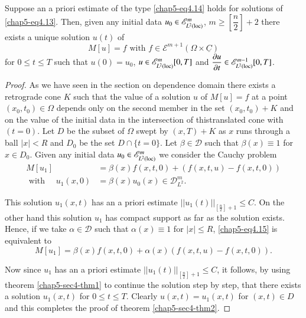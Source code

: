 \begin{theorem}\label{chap5-sec4-thm2} %
 Suppose an a priori estimate of the type \eqref{chap5-eq4.14} holds
 for solutions  of \eqref{chap5-eq4.13}. Then, given any initial data $u_0 \in
 \mathscr{E}^m_{L^2(\operatorname{loc})}$, $m \geq \left[\dfrac{n}{2}\right] + 2$
 there exists a  unique solution $u(t)$ of   
\begin{equation*}
M[u] = f \text{ with } f \in \mathscr{E}^{m+1} (\Omega \times
\underline{C}) \tag{4.1} 
\end{equation*}
for $0 \leq t \leq T$ such that $u(0) = u_0$, $u \in
\mathscr{E}^m_{L^2(\operatorname{loc})} [0, T]$ and $\dfrac{\partial u}{\partial t}
\in \mathscr{E}^{m-1}_{L^2(\operatorname{loc})} [0, T]$. 
\end{theorem}

\begin{proof}
As we have seen in the section on dependence domain there exists a
retrograde cone $K$ such that the value of a solution $u$ of $M [u] =
f$ at a point $(x_0, t_0) \in \Omega$ depends only on the
second member in the set $(x_0, t_0) + K$ and on the value of the
initial data in the intersection  of this\pageoriginale translated
cone with $(t=0)$. Let $D$ be the subset of $\Omega$ swept by $(x, T) + K$ as
$x$ runs through a ball $|x | < R$ and $D_0$ be the set $D \cap \{ t =
0 \}$. Let $\beta \in \mathscr{D}$ such that $\beta(x) \equiv 1$
for $x \in D_0$. Given any initial data $u_0  \in
\mathscr{E}^m_{L^2(\operatorname{loc})}$ we consider the Cauchy problem  
\begin{align*}
M[u_1] & = \beta (x) f (x, t, 0) + (f(x, t, u) - f(x, t, 0))\\  
\text{ with } \quad u_1 (x, 0) & = \beta (x) u_0 (x) \in
\mathscr{D}^m_{L^2}. \tag{4.15}\label{chap5-eq4.15}  
\end{align*}

This solution $u_1(x, t)$  has an a priori estimate $||u_1
(t)||_{\left[\frac{n}{2}\right]+1} \leq C$. On the other hand this
solution $u_1$ 
has compact support as far as the solution exists. Hence, if we take
$\alpha \in \mathscr{D}$ such that $\alpha (x) \equiv 1$  for
$|x| \leq R$, \eqref{chap5-eq4.15} is equivalent to  
\begin{equation*}
M[u_1] = \beta (x) f(x, t, 0) + \alpha (x) (f(x, t, u) - f (x, t,
0)). \tag*{$(4.1)'$} 
\end{equation*}

Now since $u_1$ has an a priori estimate $||u_1 (t)
||_{\left[\frac{n}{2} \right]+ 1}\leq C$, it follows, by using
theorem \ref{chap5-sec4-thm1} to continue the solution 
step by step, that there exists a solution $u_{1} (x, t)$ for $0 \leq
t \leq T$. Clearly $u(x, t) = u_1 (x, t)$ for $(x, t)\in D$
and this completes the proof of theorem \ref{chap5-sec4-thm2}.  
\end{proof}

